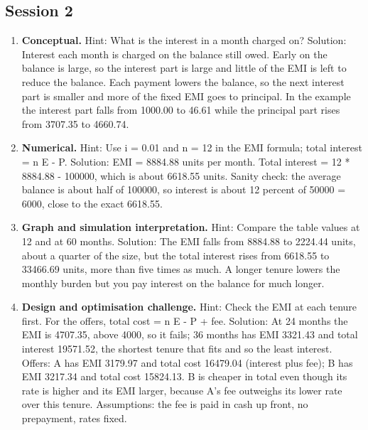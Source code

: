 \documentclass[11pt,a4paper]{article}
\begin{document}
\subsection*{Session 2}
\begin{enumerate}[nosep]
\item \textbf{Conceptual.} Hint: What is the interest in a month charged on? Solution: Interest each month is charged on the balance still owed. Early on the balance is large, so the interest part is large and little of the EMI is left to reduce the balance. Each payment lowers the balance, so the next interest part is smaller and more of the fixed EMI goes to principal. In the example the interest part falls from 1000.00 to 46.61 while the principal part rises from 3707.35 to 4660.74.
\item \textbf{Numerical.} Hint: Use i = 0.01 and n = 12 in the EMI formula; total interest = n E - P. Solution: EMI = 8884.88 units per month. Total interest = 12 * 8884.88 - 100000, which is about 6618.55 units. Sanity check: the average balance is about half of 100000, so interest is about 12 percent of 50000 = 6000, close to the exact 6618.55.
\item \textbf{Graph and simulation interpretation.} Hint: Compare the table values at 12 and at 60 months. Solution: The EMI falls from 8884.88 to 2224.44 units, about a quarter of the size, but the total interest rises from 6618.55 to 33466.69 units, more than five times as much. A longer tenure lowers the monthly burden but you pay interest on the balance for much longer.
\item \textbf{Design and optimisation challenge.} Hint: Check the EMI at each tenure first. For the offers, total cost = n E - P + fee. Solution: At 24 months the EMI is 4707.35, above 4000, so it fails; 36 months has EMI 3321.43 and total interest 19571.52, the shortest tenure that fits and so the least interest. Offers: A has EMI 3179.97 and total cost 16479.04 (interest plus fee); B has EMI 3217.34 and total cost 15824.13. B is cheaper in total even though its rate is higher and its EMI larger, because A's fee outweighs its lower rate over this tenure. Assumptions: the fee is paid in cash up front, no prepayment, rates fixed.
\end{enumerate}
\end{document}
